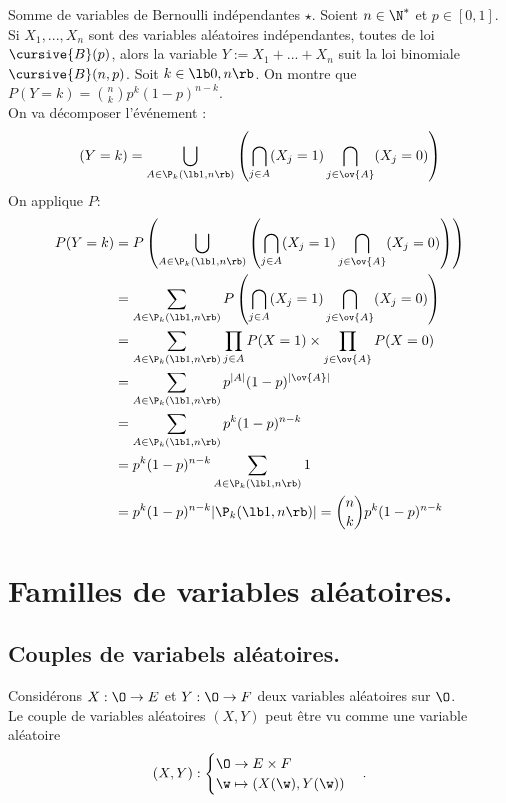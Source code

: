 \documentclass[11pt]{article}
\begin{document}
\begin{prop}{Somme de variables de Bernoulli indépendantes $\star$.}{}
    Soient $n\in\N^*$ et $p\in[0,1]$.\\
    Si $X_1,...,X_n$ sont des variables aléatoires indépendantes, toutes de loi $\cursive{B}(p)$, alors la variable $Y:=X_1+...+X_n$ suit la loi binomiale $\cursive{B}(n,p)$.
    \tcblower
    Soit $k\in\lb0,n\rb$. On montre que $P(Y=k)=\binom{n}{k}p^k(1-p)^{n-k}$.\\
    On va décomposer l'événement :
    \begin{equation*}
        (Y=k)=\bigcup_{A\in\P_k(\lb1,n\rb)}\left(\bigcap_{j\in A}(X_j=1)\bigcap_{j\in\ov{A}}(X_j=0)\right)
    \end{equation*}
    On applique $P$:
    \begin{align*}
        P(Y=k)&=P\left( \bigcup_{A\in\P_k(\lb1,n\rb)}\left( \bigcap_{j\in A}(X_j=1)\bigcap_{j\in\ov{A}}(X_j=0) \right) \right) \\
        &= \sum_{A\in\P_k(\lb1,n\rb)}P\left( \bigcap_{j\in A}(X_j=1)\bigcap_{j\in\ov{A}}(X_j=0) \right)\\
        &= \sum_{A\in\P_k(\lb1,n\rb)}\prod_{j\in A}P(X=1)\times\prod_{j\in\ov{A}}P(X=0)\\
        &=\sum_{A\in\P_k(\lb1,n\rb)}p^{|A|}(1-p)^{|\ov{A}|}\\
        &=\sum_{A\in\P_k(\lb1,n\rb)}p^k(1-p)^{n-k}\\
        &=p^k(1-p)^{n-k}\sum_{A\in\P_k(\lb1,n\rb)}1\\
        &=p^k(1-p)^{n-k}|\P_k(\lb1,n\rb)|=\binom{n}{k}p^k(1-p)^{n-k}
    \end{align*}
\end{prop}

\section{Familles de variables aléatoires.}
\subsection{Couples de variabels aléatoires.}

Considérons $X:\O\to E$ et $Y:\O\to F$ deux variables aléatoires sur $\O$.\\
Le couple de variables aléatoires $(X,Y)$ peut être vu comme une variable aléatoire
\begin{equation*}
    (X,Y):\begin{cases}
        \O\to E\times F\\
        \w \mapsto (X(\w), Y(\w))
    \end{cases}.
\end{equation*}
\end{document}
